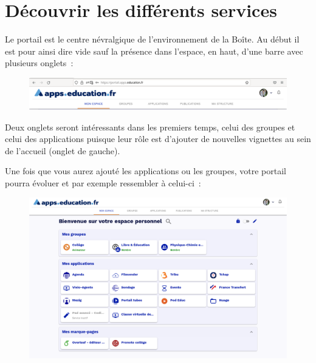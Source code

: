 \chapter{Découvrir les différents services}

Le portail est le centre névralgique de l'environnement de la Boîte. 
Au début il est pour ainsi dire vide sauf la présence dans l'espace, en haut, d'une barre avec plusieurs onglets~:
\begin{figure}
	\centering
	\includegraphics[width=\linewidth]{./Captures/portail.barre.haute.png}
\end{figure}
Deux onglets seront intéressants dans les premiers temps, celui des groupes et celui des applications puisque leur rôle est d'ajouter de nouvelles vignettes au sein de l'accueil (onglet de gauche).

Une fois que vous aurez ajouté les applications ou les groupes, votre portail pourra évoluer et par exemple ressembler à celui-ci~:
\begin{figure}
	\centering
	\includegraphics[width=\linewidth]{./Captures/portail.accueil.png}
\end{figure}

